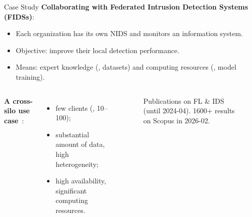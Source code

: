 \begin{frame}{Case Study}
  \bigskip
  \textbf{Collaborating with Federated Intrusion Detection Systems (FIDSs)}:
  \begin{itemize}[<+->]
    \item Each organization has its own NIDS\footnotemark{} and monitors an information system.
    \item Objective: improve their local detection performance.
    \item Means: \alert{expert knowledge} (\ie, datasets) and \alert{computing resources} (\ie, model training).
  \end{itemize}
  \onslide<+->
  \begin{columns}
    \textbf{A cross-silo use case}~\autocite{kairouz_AdvancesOpenProblems_2021}:
    \begin{itemize}
      \item few clients (\ie, 10--100);
      \item substantial amount of data, high heterogeneity;
      \item high availability, significant computing resources.
    \end{itemize}

    \onslide<+->
    \vspace{-1.5em}
    \begin{figure}
      \centering
      \resizebox{.8\linewidth}{!}{}
      \caption{Publications on FL \& IDS (until 2024-04). 1600+ results on Scopus in 2026-02.}
    \end{figure}
  \end{columns}

\end{frame}



